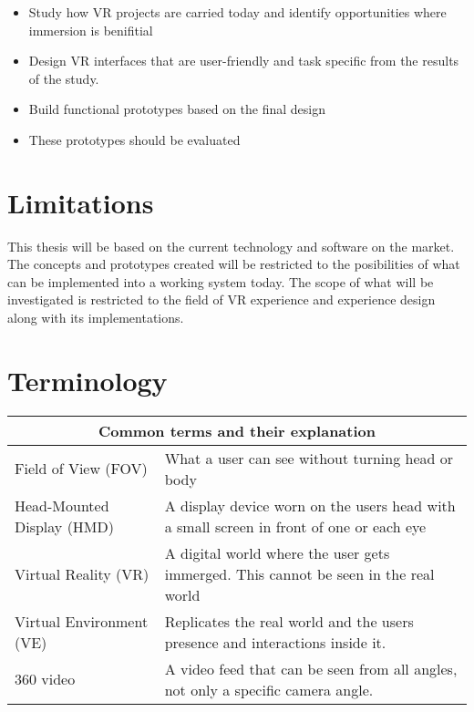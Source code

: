 \begin{itemize}
	\item Study how VR projects are carried today and identify opportunities where immersion is benifitial
	\item Design VR interfaces that are user-friendly and task specific from the results of the study.
	\item Build functional prototypes based on the final design
	\item These prototypes should be evaluated
\end{itemize}

\section{Limitations}
This thesis will be based on the current technology and software on the market. The concepts and prototypes created will be restricted to the posibilities of what can be implemented into a working system today. The scope of what will be investigated is restricted to the field of VR experience and experience design along with its implementations.

\section{Terminology}
\begin{tabular}{ | p{5.5cm} | p{6.5cm} |  }
	\hline
     	\multicolumn{2}{|c|}{Common terms and their explanation} \\
     	\hline
	Field of View (FOV) & What a user can see without turning head or body \\
    	\hline
     	Head-Mounted Display (HMD) & A display device worn on the users head with a small screen in front of one or each eye \\
    	\hline
     	Virtual Reality (VR) & A digital world where the user gets immerged. This cannot be seen in the real world
			\\
    	\hline
	Virtual Environment (VE) & Replicates the real world and the users presence and interactions inside it.  \\
     	\hline
     	360 video & A video feed that can be seen from all angles, not only a specific camera angle. \\
     	\hline

\end{tabular}
